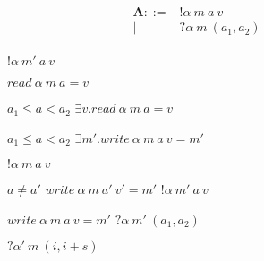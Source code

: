 \documentclass{article}
\begin{document}
\begin{figure}
  \begin{minipage}{0.33\textwidth}
    \[\begin{split}
    \mathbf{A} ::= & ! \alpha ~ m ~ a ~ v \\
    |& ? \alpha ~ m ~ (a_1,a_2) \\
    \end{split}\]
  \end{minipage}
  \begin{minipage}{0.33\textwidth}
             {\(! \alpha ~ m' ~ a ~ v\)}
  \end{minipage}
  \begin{minipage}{0.33\textwidth}
             {\(\mathit{read} ~ \alpha ~ m ~ a = v\)}
  \end{minipage}
  \begin{minipage}{0.33\textwidth}
                {\(a_1 \leq a < a_2\)}
                {\(\exists v . \mathit{read} ~ \alpha ~ m ~ a = v\)}
  \end{minipage}
  \begin{minipage}{0.33\textwidth}
                {\(a_1 \leq a < a_2\)}
                {\(\exists m' . \mathit{write} ~ \alpha ~ m ~ a ~ v = m'\)}
  \end{minipage}
  \begin{minipage}{0.33\textwidth}
             {\(! \alpha ~ m ~ a ~ v\)}
  \end{minipage}
  \begin{minipage}{0.33\textwidth}
                      {\(a \not = a'\)}
                      {\(\mathit{write} ~ \alpha ~ m ~ a' ~ v' = m'\)}
                      {\(!\alpha ~ m' ~ a ~ v\)}
  \end{minipage}
  \begin{minipage}{0.33\textwidth}
               {\(\mathit{write} ~ \alpha ~ m ~ a ~ v = m'\)}
               {\(?\alpha ~ m' ~ (a_1,a_2)\)}
  \end{minipage}
  \begin{minipage}{0.33\textwidth}
             {\(?\alpha' ~ m ~ (i,i+s)\)}
  \end{minipage}
  \begin{minipage}{0.33\textwidth}

\end{minipage}
\end{figure}
\end{document}

